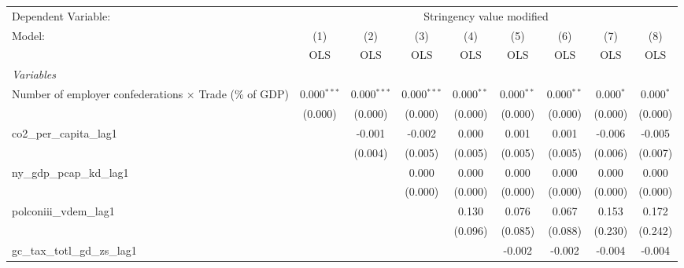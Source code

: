 
\begingroup
\centering
\begin{tabular}{lcccccccc}
   \toprule
   Dependent Variable: & \multicolumn{8}{c}{Stringency value modified}\\
   Model:                                                         & (1)           & (2)           & (3)           & (4)          & (5)          & (6)          & (7)         & (8)\\  
                                                                  &  OLS          & OLS           & OLS           & OLS          & OLS          & OLS          & OLS         & OLS\\  
   \midrule
   \emph{Variables}\\
   Number of employer confederations $\times$ Trade (\% of GDP)   & 0.000$^{***}$ & 0.000$^{***}$ & 0.000$^{***}$ & 0.000$^{**}$ & 0.000$^{**}$ & 0.000$^{**}$ & 0.000$^{*}$ & 0.000$^{*}$\\   
                                                                  & (0.000)       & (0.000)       & (0.000)       & (0.000)      & (0.000)      & (0.000)      & (0.000)     & (0.000)\\   
   co2\_per\_capita\_lag1                                         &               & -0.001        & -0.002        & 0.000        & 0.001        & 0.001        & -0.006      & -0.005\\   
                                                                  &               & (0.004)       & (0.005)       & (0.005)      & (0.005)      & (0.005)      & (0.006)     & (0.007)\\   
   ny\_gdp\_pcap\_kd\_lag1                                        &               &               & 0.000         & 0.000        & 0.000        & 0.000        & 0.000       & 0.000\\   
                                                                  &               &               & (0.000)       & (0.000)      & (0.000)      & (0.000)      & (0.000)     & (0.000)\\   
   polconiii\_vdem\_lag1                                          &               &               &               & 0.130        & 0.076        & 0.067        & 0.153       & 0.172\\   
                                                                  &               &               &               & (0.096)      & (0.085)      & (0.088)      & (0.230)     & (0.242)\\   
   gc\_tax\_totl\_gd\_zs\_lag1                                    &               &               &               &              & -0.002       & -0.002       & -0.004      & -0.004\\   

\end{tabular}
